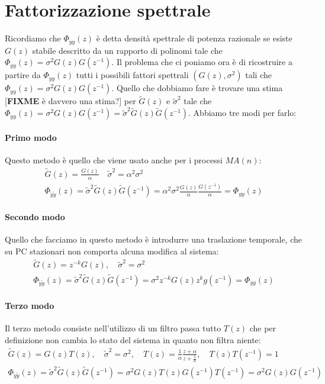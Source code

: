 \section{Fattorizzazione spettrale}
Ricordiamo che $\Phi_{yy}(z)$ è detta densità spettrale di potenza razionale se esiste $G(z)$ stabile descritto da un rapporto di polinomi tale che $\Phi_{yy}(z)=\sigma^2G(z)G(z^{-1})$. Il problema che ci poniamo ora è di ricostruire a partire da $\Phi_{yy}(z)$ tutti i possibili fattori spettrali $(G(z),\sigma^2)$ tali che $\Phi_{yy}(z)=\sigma^2G(z)G(z^{-1})$. Quello che dobbiamo fare è trovare una stima [\textbf{FIXME} è davvero una stima?] per $\tilde{G}(z)$ e $\tilde{\sigma}^2$ tale che $\Phi_{yy}(z)=\sigma^2G(z)G(z^{-1})=\tilde{\sigma}^2\tilde{G}(z)\tilde{G}(z^{-1})$. Abbiamo tre modi per farlo:

\paragraph{Primo modo}
Questo metodo è quello che viene usato anche per i processi $MA(n)$:
  \begin{gather*}
    \tilde{G}(z)=\frac{G(z)}{\alpha} \quad \tilde{\sigma}^2=\alpha^2\sigma^2 \\
    \Phi_{\tilde{y}\tilde{y}}(z)=\tilde{\sigma}^2\tilde{G}(z)\tilde{G}(z^{-1})=\alpha^2\sigma^2\frac{G(z)}{\alpha}\frac{G(z^{-1})}{\alpha}=\Phi_{yy}(z)
  \end{gather*}
  
\paragraph{Secondo modo}
Quello che facciamo in questo metodo è introdurre una traslazione temporale, che su PC stazionari non comporta alcuna modifica al sistema:
  \begin{gather*}
    \tilde{G}(z)=z^{-k}G(z), \quad \tilde{\sigma}^2=\sigma^2\\
    \Phi_{\tilde{y}\tilde{y}}(z)=\tilde{\sigma}^2\tilde{G}(z)\tilde{G}(z^{-1})=\sigma^2z^{-k}G(z)z^kg(z^{-1})=\Phi_{yy}(z)
  \end{gather*}
\paragraph{Terzo modo}
Il terzo metodo consiste nell'utilizzo di un filtro passa tutto $T(z)$ che per definizione non cambia lo stato del sistema in quanto non filtra niente:
  \begin{gather*}
    \tilde{G}(z)=G(z)T(z),\quad \tilde{\sigma}^2=\sigma^2,\quad T(z)=\frac{1}{\alpha}\frac{z+\alpha}{z+\frac{1}{\alpha}},\quad T(z)T(z^{-1})=1\\
    \Phi_{\tilde{y}\tilde{y}}(z)=\tilde{\sigma}^2\tilde{G}(z)\tilde{G}(z^{-1})=\sigma^2G(z)T(z)G(z^{-1})T(z^{-1})=\sigma^2G(z)G(z^{-1})
  \end{gather*}
  
